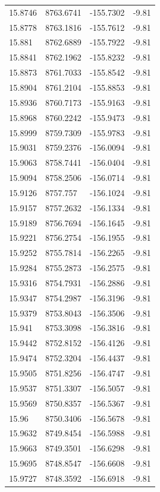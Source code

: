 \begin{table}[H]
\begin{tabular}{llll}
15.8746 & 8763.6741 & -155.7302 & -9.81 \\
15.8778 & 8763.1816 & -155.7612 & -9.81 \\
15.881 & 8762.6889 & -155.7922 & -9.81 \\
15.8841 & 8762.1962 & -155.8232 & -9.81 \\
15.8873 & 8761.7033 & -155.8542 & -9.81 \\
15.8904 & 8761.2104 & -155.8853 & -9.81 \\
15.8936 & 8760.7173 & -155.9163 & -9.81 \\
15.8968 & 8760.2242 & -155.9473 & -9.81 \\
15.8999 & 8759.7309 & -155.9783 & -9.81 \\
15.9031 & 8759.2376 & -156.0094 & -9.81 \\
15.9063 & 8758.7441 & -156.0404 & -9.81 \\
15.9094 & 8758.2506 & -156.0714 & -9.81 \\
15.9126 & 8757.757 & -156.1024 & -9.81 \\
15.9157 & 8757.2632 & -156.1334 & -9.81 \\
15.9189 & 8756.7694 & -156.1645 & -9.81 \\
15.9221 & 8756.2754 & -156.1955 & -9.81 \\
15.9252 & 8755.7814 & -156.2265 & -9.81 \\
15.9284 & 8755.2873 & -156.2575 & -9.81 \\
15.9316 & 8754.7931 & -156.2886 & -9.81 \\
15.9347 & 8754.2987 & -156.3196 & -9.81 \\
15.9379 & 8753.8043 & -156.3506 & -9.81 \\
15.941 & 8753.3098 & -156.3816 & -9.81 \\
15.9442 & 8752.8152 & -156.4126 & -9.81 \\
15.9474 & 8752.3204 & -156.4437 & -9.81 \\
15.9505 & 8751.8256 & -156.4747 & -9.81 \\
15.9537 & 8751.3307 & -156.5057 & -9.81 \\
15.9569 & 8750.8357 & -156.5367 & -9.81 \\
15.96 & 8750.3406 & -156.5678 & -9.81 \\
15.9632 & 8749.8454 & -156.5988 & -9.81 \\
15.9663 & 8749.3501 & -156.6298 & -9.81 \\
15.9695 & 8748.8547 & -156.6608 & -9.81 \\
15.9727 & 8748.3592 & -156.6918 & -9.81 \\

\end{tabular}
\end{table}
